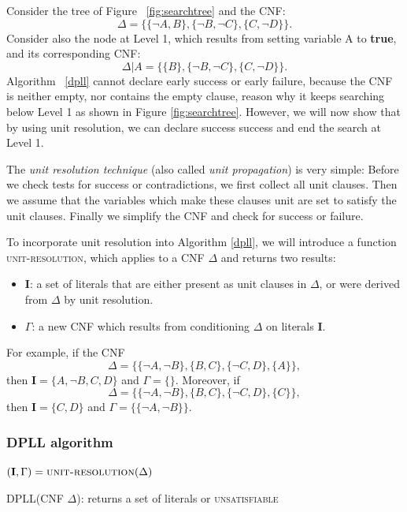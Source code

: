 \documentclass[12pt]{diicc}
\begin{document}
Consider the tree of Figure ~\ref{fig:searchtree} and the CNF:
\[\Delta=\{\{\neg A,B\},\{\neg B,\neg C\},\{C,\neg D\}\}.\]
Consider also the node at Level 1, which results from setting variable A to \textbf{true}, and its corresponding CNF:
\[\Delta |A=\{\{B\},\{\neg B,\neg C\},\{C,\neg D\}\}.\]
Algorithm ~\ref{dpll} cannot declare early success or early failure, because the CNF is neither empty, nor contains the empty clause, reason why it keeps searching below Level 1 as shown in Figure \ref{fig:searchtree}. However, we will now show that by using unit resolution, we can declare success success and end the search at Level 1.

The \textit{unit resolution technique} (also called \textit{unit propagation}) is very simple: Before we check tests for success or contradictions, we first collect all unit clauses. Then we assume that the variables which make these clauses unit are set to satisfy the unit clauses. Finally we simplify the CNF and check for success or failure.

To incorporate unit resolution into Algorithm \ref{dpll}, we will introduce a function \textsc{unit-resolution}, which applies to a CNF $\Delta$ and returns two results:
\begin{itemize}
	\item \textbf{I}: a set of literals that are either present as unit clauses in $\Delta$, or were derived from $\Delta$ by unit resolution.
	\item $\Gamma$: a new CNF which results from conditioning $\Delta$ on literals \textbf{I}.
\end{itemize}
For example, if the CNF
\[\Delta=\{\{\neg A,\neg B\},\{B,C\},\{\neg C,D\},\{A\}\},\]
then $\textbf{I}=\{A,\neg B,C,D\}$ and $\Gamma=\{\}$. Moreover, if
\[\Delta=\{\{\neg A,\neg B\},\{B,C\},\{\neg C,D\},\{C\}\},\]
then $\textbf{I}=\{C,D\}$ and $\Gamma=\{\{\neg A,\neg B\}\}$.

\subsubsection{DPLL algorithm}

\begin{algorithm}
$(\textbf{I},\Gamma)=\textsc{unit-resolution}(\Delta)$\\
\caption{DPLL(CNF $\Delta$): returns a set of literals or \textsc{unsatisfiable}\label{dpllplus}}
\end{algorithm}    
\end{document}
